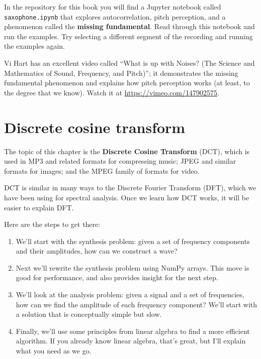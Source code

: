 \documentclass[12pt]{book}
\begin{document}
\begin{exercise}
In the repository for this book you will find a Jupyter notebook
called \verb"saxophone.ipynb" that explores autocorrelation,
pitch perception, and a phenomenon called the {\bf missing fundamental}.
Read through this notebook and run the examples.  Try selecting
a different segment of the recording and running the examples again.

Vi Hart has an excellent video called ``What is up with Noises? (The
Science and Mathematics of Sound, Frequency, and Pitch)''; it
demonstrates the missing fundamental phenomenon and explains how pitch
perception works (at least, to the degree that we know).  Watch it at
\url{https://vimeo.com/147902575}.



\end{exercise}



\chapter{Discrete cosine transform}
\label{dct}

The topic of this chapter is the {\bf Discrete Cosine
  Transform} (DCT), which is used in MP3 and related formats for
compressing music; JPEG and similar formats for images; and the MPEG
family of formats for video.

DCT is similar in many ways to the Discrete Fourier Transform (DFT),
which we have been using for spectral analysis.
Once we learn how DCT works, it will be easier to explain DFT.

Here are the steps to get there:

\begin{enumerate}

\item We'll start with the synthesis problem: given a set of frequency
  components and their amplitudes, how can we construct a wave?

\item Next we'll rewrite the synthesis problem using NumPy arrays.
  This move is good for performance, and also provides insight
  for the next step.

\item We'll look at the analysis problem: given a signal and a
  set of frequencies, how can we find the amplitude of each frequency
  component?  We'll start with a solution that is conceptually simple
  but slow.

\item Finally, we'll use some principles from linear algebra to find a
  more efficient algorithm.  If you already know linear algebra,
  that's great, but I'll explain what you need as we go.

\end{enumerate}
\end{document}
